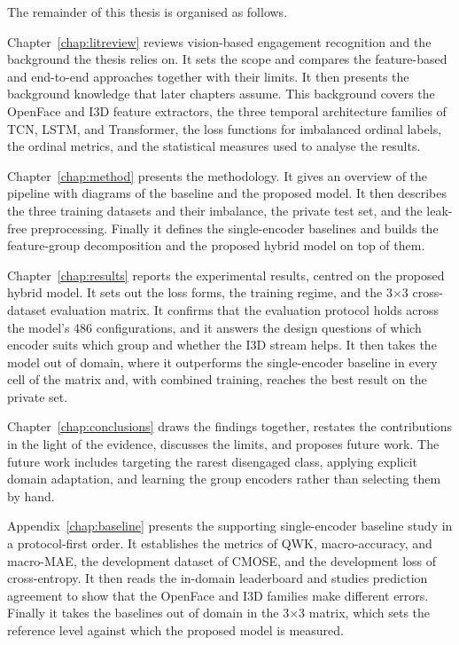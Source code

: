 \documentclass[../main.tex]{subfiles}
\begin{document}
The remainder of this thesis is organised as follows.

Chapter~\ref{chap:litreview} reviews vision-based engagement recognition and the background the thesis relies on. It sets the scope and compares the feature-based and end-to-end approaches together with their limits. It then presents the background knowledge that later chapters assume. This background covers the OpenFace and I3D feature extractors, the three temporal architecture families of TCN, LSTM, and Transformer, the loss functions for imbalanced ordinal labels, the ordinal metrics, and the statistical measures used to analyse the results.

Chapter~\ref{chap:method} presents the methodology. It gives an overview of the pipeline with diagrams of the baseline and the proposed model. It then describes the three training datasets and their imbalance, the private test set, and the leak-free preprocessing. Finally it defines the single-encoder baselines and builds the feature-group decomposition and the proposed hybrid model on top of them.

Chapter~\ref{chap:results} reports the experimental results, centred on the proposed hybrid model. It sets out the loss forms, the training regime, and the 3$\times$3 cross-dataset evaluation matrix. It confirms that the evaluation protocol holds across the model's 486 configurations, and it answers the design questions of which encoder suits which group and whether the I3D stream helps. It then takes the model out of domain, where it outperforms the single-encoder baseline in every cell of the matrix and, with combined training, reaches the best result on the private set.

Chapter~\ref{chap:conclusions} draws the findings together, restates the contributions in the light of the evidence, discusses the limits, and proposes future work. The future work includes targeting the rarest disengaged class, applying explicit domain adaptation, and learning the group encoders rather than selecting them by hand.

Appendix~\ref{chap:baseline} presents the supporting single-encoder baseline study in a protocol-first order. It establishes the metrics of QWK, macro-accuracy, and macro-MAE, the development dataset of CMOSE, and the development loss of cross-entropy. It then reads the in-domain leaderboard and studies prediction agreement to show that the OpenFace and I3D families make different errors. Finally it takes the baselines out of domain in the 3$\times$3 matrix, which sets the reference level against which the proposed model is measured.
\end{document}
